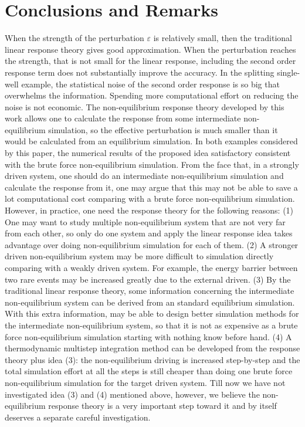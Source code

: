\documentclass[aip,jcp,a4paper,reprint,onecolumn]{revtex4-1}
\newcommand{\eps}{\varepsilon}
\begin{document}
\section{Conclusions and Remarks}

When the strength of the perturbation $\eps$ is relatively small, then
the traditional linear response theory gives good approximation.  When
the perturbation reaches the strength, that is not small for the
linear response, including the second order response term does not
substantially improve the accuracy.
In the splitting single-well example, the statistical
noise of the second order response is so big that overwhelms the
information. Spending more computational effort on reducing the noise
is not economic. The non-equilibrium response theory developed by this
work allows one to calculate the response from some intermediate
non-equilibrium simulation, so the effective perturbation is much
smaller than it would be calculated from an equilibrium
simulation.
In both examples considered by this paper, the
numerical results of the proposed idea  satisfactory consistent with the
brute force non-equilibrium simulation.
From the face that, in a strongly driven system,
one should do an intermediate non-equilibrium
simulation and calculate the response from it,
one may argue that this may not be able to
save a lot computational cost comparing with a brute force
non-equilibrium simulation.  However, in practice, one need the
response theory for the following reasons: (1) One may want to study
multiple non-equilibrium system that are not very far from each other,
so only do one system and apply the linear response idea takes
advantage over doing non-equilibrium simulation for each of them.
(2) A stronger driven non-equilibrium system may be more difficult to
simulation directly comparing with a weakly driven system. For
example, the energy barrier between two rare events may be increased
greatly due to the external driven. (3) By the traditional linear
response theory, some information concerning the intermediate
non-equilibrium system can be derived from an standard equilibrium
simulation.
With this extra information, may be able to design better simulation methods
for the intermediate non-equilibrium system,
so that it is not as expensive as a brute force non-equilibrium
simulation starting with nothing know before hand.
(4) A thermodynamic multistep integration method can be developed from the
response theory plus idea (3): the non-equilibrium driving is increased
step-by-step and the total simulation effort at all the steps is still
cheaper than doing one brute force non-equilibrium simulation for the
target driven system.
Till now we have not investigated idea (3) and (4) mentioned above,
however, we believe the non-equilibrium response theory is a very
important step toward it and by itself deserves a separate careful
investigation.
\end{document}
